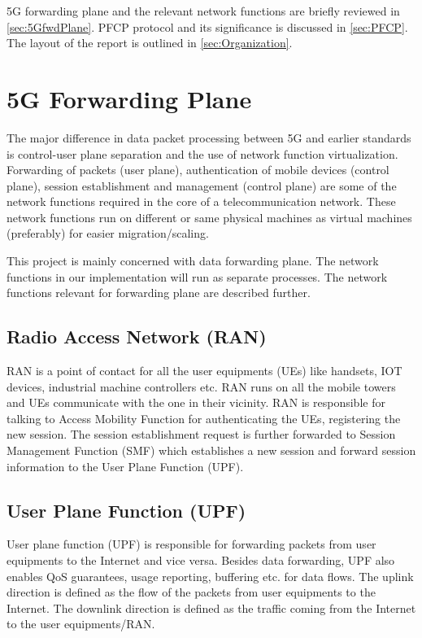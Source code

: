 5G forwarding plane and the relevant network functions are 
briefly reviewed in \ref{sec:5GfwdPlane}. PFCP protocol and its 
significance is discussed in \ref{sec:PFCP}. 
The layout of the report is outlined in \ref{sec:Organization}. 

\section {5G Forwarding Plane \label{sec:5GfwdPlane}}
The major difference in  data packet processing between 5G and earlier standards is control-user plane 
separation and the use of network function virtualization. Forwarding of packets (user plane), 
authentication of mobile devices (control plane), session establishment and management (control plane) are some of the network 
functions required in the core of a telecommunication network. These network functions run on different or same physical machines as 
virtual machines (preferably) for easier migration/scaling.

This project is mainly concerned with data forwarding plane. The network functions in our implementation will 
run as separate processes. The network functions relevant for forwarding plane are described further.
\subsection{Radio Access Network (RAN) \label{sec:RAN}} 
RAN is a point of contact for all the user equipments (UEs) like handsets, IOT devices, industrial machine controllers etc. 
RAN runs on all the mobile towers and UEs communicate with the one in their vicinity. RAN is
 responsible for talking to Access Mobility Function for authenticating the UEs, registering the  new
  session. The session establishment request is further forwarded to Session Management Function
  (SMF) which establishes a new session and forward session information to the User Plane Function (UPF). 
  \subsection{User Plane Function (UPF) \label{sec:UPF}}
  User plane function (UPF) is responsible for forwarding packets from user 
  equipments to the Internet and vice versa. Besides data forwarding, UPF also enables QoS guarantees, usage reporting, buffering etc. for data flows.
    The uplink direction is defined as the flow of the packets from user
    equipments to the Internet. The downlink direction is defined as the traffic coming from the Internet  to the user equipments/RAN. 
  
